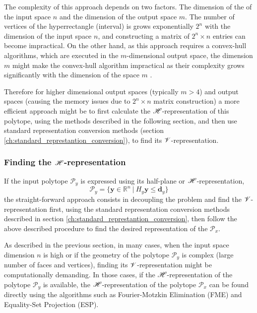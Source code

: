 The complexity of this approach depends on two factors. The dimension of the of the input space $n$ and the dimension of the output space $m$. The number of vertices of the hyperrectangle (interval) is grows exponentially $2^n$ with the dimension of the input space $n$, and constructing a matrix of $2^n \times n$ entries can become impractical. On the other hand, as this approach requires a convex-hull algorithms, which are executed in the $m$-dimensional output space, the dimension $m$ might make the convex-hull algorithm impractical as their complexity grows significantly with the dimension of the space $m$ \cite{Barber1996}.

Therefore for higher dimensional output spaces (typically $m> 4$) and output spaces (causing the memory issues due to  $2^n \times n$ matrix construction) a more efficient approach might be to first calculate the $\mathscr{H}$-representation of this polytope, using the methods described in the following section, and then use standard representation conversion methods (section \ref{ch:standard_represtantion_conversion}), to find its $\mathscr{V}$-representation.


\subsubsection{Finding the $\mathscr{H}$-representation}
\label{ch:proj_algos_h}

If the input polytope $\mathcal{P}_y$ is expressed using its half-plane or $\mathscr{H}$-representation, 
\begin{equation}
    \mathcal{P}_y = \{ \bm{y}\in\mathbb{R}^n ~|~H_y\bm{y} \leq \bm{d}_y\}
\end{equation}
the straight-forward approach consists in decoupling the problem and find the $\mathscr{V}$-representation first, using the standard representation conversion methods  described in section \ref{ch:standard_represtantion_conversion}, then follow the above described procedure to find the desired representation of the $\mathcal{P}_x$. 

As described in the previous section, in many cases, when the input space dimension $n$ is high or if the geometry of the polytope  $\mathcal{P}_y$ is complex (large number of faces and vertices), finding its $\mathscr{V}$-representation might be computationally demanding. In those cases, if the $\mathscr{H}$-representation of the polytope $\mathcal{P}_y$ is available, the $\mathscr{H}$-representation of the polytope $\mathcal{P}_x$ can be found directly using the algorithms such as Fourier-Motzkin Elimination (FME) and Equality-Set Projection (ESP). 

